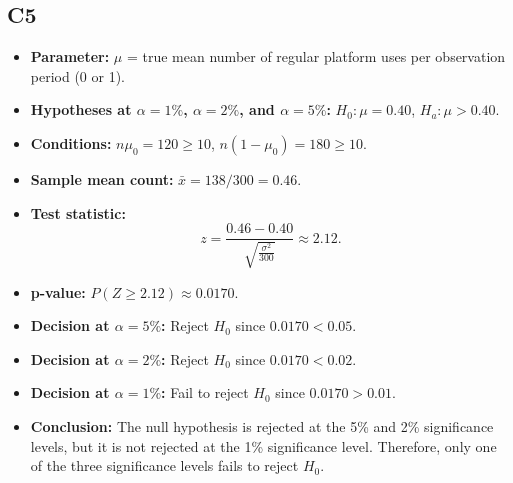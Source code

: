 \subsection*{C5}
\begin{itemize}
	\item \textbf{Parameter:} \(\mu\) = true mean number of regular platform uses per observation period (0 or 1).
	\item \textbf{Hypotheses at \(\alpha=1\%\), \(\alpha=2\%\), and \(\alpha=5\%\):} \(H_0\colon \mu=0.40\), \(H_a\colon \mu>0.40\).
	\item \textbf{Conditions:} \(n\mu_0=120\ge10\), \(n(1-\mu_0)=180\ge10\).
	\item \textbf{Sample mean count:} \(\bar x=138/300=0.46\).
	\item \textbf{Test statistic:}
	\[
	z=\frac{0.46-0.40}{\sqrt{\frac{\sigma^2}{300}}}\approx 2.12.
	\]
	\item \textbf{p-value:} \(P(Z\ge 2.12)\approx 0.0170\).
	\item \textbf{Decision at \(\alpha=5\%\):} Reject \(H_0\) since \(0.0170<0.05\).
	\item \textbf{Decision at \(\alpha=2\%\):} Reject \(H_0\) since \(0.0170<0.02\).
	\item \textbf{Decision at \(\alpha=1\%\):} Fail to reject \(H_0\) since \(0.0170>0.01\).
	\item \textbf{Conclusion:} The null hypothesis is rejected at the 5\% and 2\% significance levels, but it is not rejected at the 1\% significance level. Therefore, only one of the three significance levels fails to reject \(H_0\).
\end{itemize}

\begin{center}
\end{center}


\begin{center}
\end{center}


\begin{center}
\end{center}

